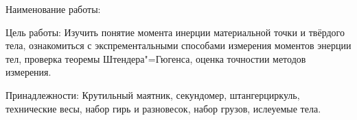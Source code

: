 Наименование работы: %

Цель работы:
Изучить понятие момента инерции материальной точки и твёрдого тела,
ознакомиться с экспрементальными способами измерения моментов энерции тел,
проверка теоремы Штендера"=Гюгенса, оценка точностии методов измерения.

Принадлежности: 
Крутильный маятник, секундомер, штангерциркуль,
технические весы, набор гирь и разновесок, набор грузов, ислеуемые тела.
